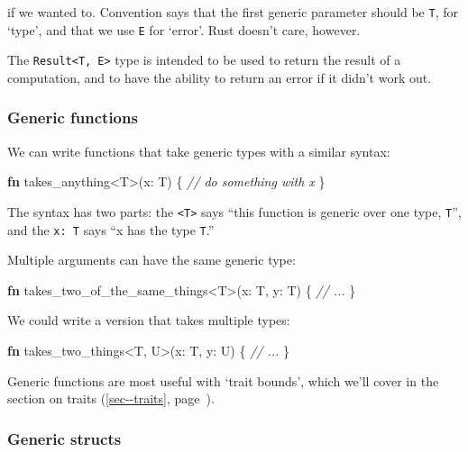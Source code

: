\documentclass[a4paper,]{book}
\renewcommand*{\hyperref}[2][\ar]{%
  \def\ar{#2}%
  #2 (\autoref{#1}, page~\pageref{#1})}
\newenvironment{Shaded}{\begin{snugshade}}{\end{snugshade}}
\newcommand{\KeywordTok}[1]{\textcolor[rgb]{0.13,0.29,0.53}{\textbf{{#1}}}}
\newcommand{\CommentTok}[1]{\textcolor[rgb]{0.56,0.35,0.01}{\textit{{#1}}}}
\newcommand{\NormalTok}[1]{{#1}}
\begin{document}
if we wanted to. Convention says that the first generic parameter should
be \texttt{T}, for `type', and that we use \texttt{E} for `error'. Rust
doesn't care, however.

The \texttt{Result\textless{}T,\ E\textgreater{}} type is intended to be
used to return the result of a computation, and to have the ability to
return an error if it didn't work out.

\subsubsection{Generic functions}\label{generic-functions}

We can write functions that take generic types with a similar syntax:

\begin{Shaded}
\begin{Highlighting}[]
\KeywordTok{fn} \NormalTok{takes_anything<T>(x: T) \{}
    \CommentTok{// do something with x}
\NormalTok{\}}
\end{Highlighting}
\end{Shaded}

The syntax has two parts: the \texttt{\textless{}T\textgreater{}} says
``this function is generic over one type, \texttt{T}'', and the
\texttt{x:\ T} says ``x has the type \texttt{T}.''

Multiple arguments can have the same generic type:

\begin{Shaded}
\begin{Highlighting}[]
\KeywordTok{fn} \NormalTok{takes_two_of_the_same_things<T>(x: T, y: T) \{}
    \CommentTok{// ...}
\NormalTok{\}}
\end{Highlighting}
\end{Shaded}

We could write a version that takes multiple types:

\begin{Shaded}
\begin{Highlighting}[]
\KeywordTok{fn} \NormalTok{takes_two_things<T, U>(x: T, y: U) \{}
    \CommentTok{// ...}
\NormalTok{\}}
\end{Highlighting}
\end{Shaded}

Generic functions are most useful with `trait bounds', which we'll cover
in the \hyperref[sec--traits]{section on traits}.

\subsubsection{Generic structs}\label{generic-structs}
\end{document}
